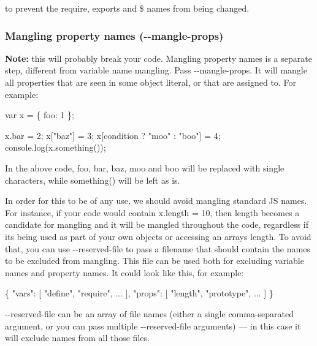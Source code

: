 to prevent the {\ttfamily require}, {\ttfamily exports} and {\ttfamily \$} names from being changed.

\subsubsection*{Mangling property names ({\ttfamily -\/-\/mangle-\/props})}

{\bfseries Note\+:} this will probably break your code. Mangling property names is a separate step, different from variable name mangling. Pass {\ttfamily -\/-\/mangle-\/props}. It will mangle all properties that are seen in some object literal, or that are assigned to. For example\+:


\begin{DoxyCode}
var x = \{
  foo: 1
\};

x.bar = 2;
x[\textcolor{stringliteral}{"baz"}] = 3;
x[condition ? \textcolor{stringliteral}{"moo"} : \textcolor{stringliteral}{"boo"}] = 4;
console.log(x.something());
\end{DoxyCode}


In the above code, {\ttfamily foo}, {\ttfamily bar}, {\ttfamily baz}, {\ttfamily moo} and {\ttfamily boo} will be replaced with single characters, while {\ttfamily something()} will be left as is.

In order for this to be of any use, we should avoid mangling standard J\+S names. For instance, if your code would contain {\ttfamily x.\+length = 10}, then {\ttfamily length} becomes a candidate for mangling and it will be mangled throughout the code, regardless if it\textquotesingle{}s being used as part of your own objects or accessing an array\textquotesingle{}s length. To avoid that, you can use {\ttfamily -\/-\/reserved-\/file} to pass a filename that should contain the names to be excluded from mangling. This file can be used both for excluding variable names and property names. It could look like this, for example\+:


\begin{DoxyCode}
\{
  \textcolor{stringliteral}{"vars"}: [ \textcolor{stringliteral}{"define"}, \textcolor{stringliteral}{"require"}, ... ],
  \textcolor{stringliteral}{"props"}: [ \textcolor{stringliteral}{"length"}, \textcolor{stringliteral}{"prototype"}, ... ]
\}
\end{DoxyCode}


{\ttfamily -\/-\/reserved-\/file} can be an array of file names (either a single comma-\/separated argument, or you can pass multiple {\ttfamily -\/-\/reserved-\/file} arguments) — in this case it will exclude names from all those files.

